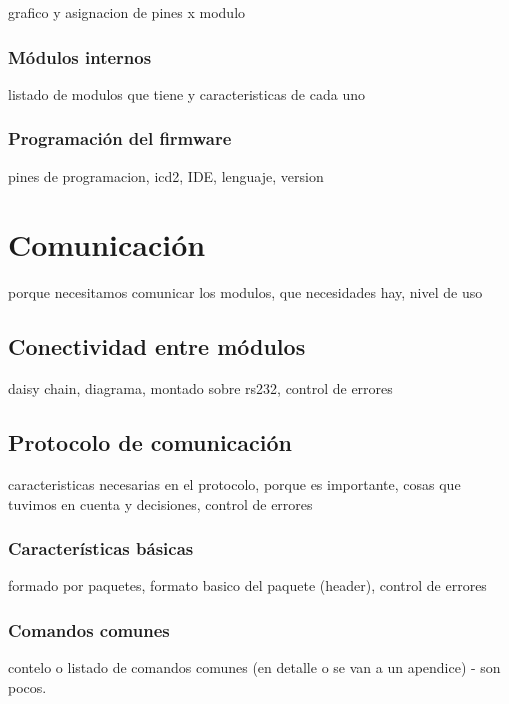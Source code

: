 grafico y asignacion de pines x modulo

\subsubsection{M\'odulos internos}
\label{}

listado de modulos que tiene y caracteristicas de cada uno

\subsubsection{Programaci\'on del firmware}
\label{}

pines de programacion, icd2, IDE, lenguaje, version

\section{Comunicaci\'on}
\label{}

porque necesitamos comunicar los modulos, que necesidades hay, nivel de uso

\subsection{Conectividad entre m\'odulos}
\label{}

daisy chain, diagrama, montado sobre rs232, control de errores

\subsection{Protocolo de comunicaci\'on}
\label{}

caracteristicas necesarias en el protocolo, porque es importante, cosas que tuvimos en cuenta y decisiones, control de errores

\subsubsection{Caracter\'isticas b\'asicas}
\label{}

formado por paquetes, formato basico del paquete (header), control de errores

\subsubsection{Comandos comunes}
\label{}

contelo o listado de comandos comunes (en detalle o se van a un apendice) - son pocos.

